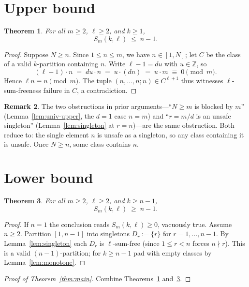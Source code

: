\documentclass[11pt]{amsart}
\theoremstyle{plain}
\newtheorem{theorem}{Theorem}[section]
\theoremstyle{definition}
\newtheorem{remark}[theorem]{Remark}
\newcommand{\Sm}{S_m(k,\ell)}
\begin{document}
\section{Upper bound}\label{sec:upper}

\begin{theorem}\label{thm:unified-upper}
For all $m\ge 2$, $\ell\ge 2$, and $k\ge 1$,
\[
\Sm \;\le\; n - 1.
\]
\end{theorem}
\begin{proof}
Suppose $N\ge n$. Since $1\le n\le m$, we have $n\in[1,N]$; let $C$ be the class of a valid $k$-partition containing $n$. Write $\ell-1 = du$ with $u\in\mathbb{Z}$, so
\[
(\ell - 1)\cdot n \;=\; du\cdot n \;=\; u\cdot(dn) \;=\; u\cdot m \;\equiv\; 0 \pmod m.
\]
Hence $\ell n \equiv n \pmod m$. The tuple $(n,\ldots,n;n)\in C^{\ell+1}$ thus witnesses $\ell$-sum-freeness failure in $C$, a contradiction.
\end{proof}

\begin{remark}
The two obstructions in prior arguments---``$N\ge m$ is blocked by $m$'' (Lemma~\ref{lem:univ-upper}, the $d=1$ case $n=m$) and ``$r=m/d$ is an unsafe singleton'' (Lemma~\ref{lem:singleton} at $r=n$)---are the same obstruction. Both reduce to: the single element $n$ is unsafe as a singleton, so any class containing it is unsafe. Once $N\ge n$, some class contains $n$.
\end{remark}

\section{Lower bound}\label{sec:lower}

\begin{theorem}\label{thm:unified-lower}
For all $m\ge 2$, $\ell\ge 2$, and $k\ge n-1$,
\[
\Sm \;\ge\; n - 1.
\]
\end{theorem}
\begin{proof}
If $n=1$ the conclusion reads $\Sm\ge 0$, vacuously true. Assume $n\ge 2$. Partition $[1,n-1]$ into singletons $D_r := \{r\}$ for $r=1,\ldots,n-1$. By Lemma~\ref{lem:singleton} each $D_r$ is $\ell$-sum-free (since $1\le r<n$ forces $n\nmid r$). This is a valid $(n-1)$-partition; for $k\ge n-1$ pad with empty classes by Lemma~\ref{lem:monotone}.
\end{proof}

\begin{proof}[Proof of Theorem~\ref{thm:main}]
Combine Theorems~\ref{thm:unified-upper} and~\ref{thm:unified-lower}.
\end{proof}
\end{document}
